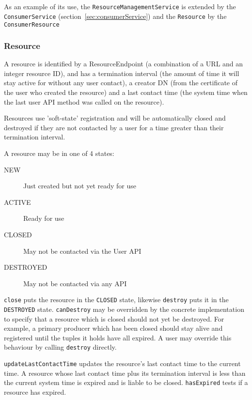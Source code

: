 As an example of its use, the  \texttt{ResourceManagementService} is extended
by the \texttt{ConsumerService} (section~\ref{sec:consumerService}) and
the \texttt{Resource} by the \texttt{ConsumerResource}

\subsubsection{Resource}
\label{sec:Resource}

A resource is identified by a ResourceEndpoint (a combination of a URL
and an integer resource ID), and has a termination interval (the
amount of time it will stay active for without any user contact), a
creator DN (from the certificate of the user who created the resource)
and a last contact time (the system time when the last user API method
was called on the resource).

Resources use 'soft-state' registration and will be automatically
closed and destroyed if they are not contacted by a user for a time
greater than their termination interval.

A resource may be in one of 4 states:

\begin{description}

\item[NEW] Just created but not yet ready for use

\item[ACTIVE] Ready for use

\item[CLOSED] May not be contacted via the User API

\item[DESTROYED] May not be contacted via any API

\end{description}

\texttt{close} puts the resource in the \texttt{CLOSED} state,
likewise \texttt{destroy} puts it in the \texttt{DESTROYED}
state. \texttt{canDestroy} may be overridden by the concrete
implementation to specify that a resource which is closed should not
yet be destroyed. For example, a primary producer which has been
closed should stay alive and registered until the tuples it holds have
all expired. A user may override this behaviour by calling
\texttt{destroy} directly.

\texttt{updateLastContactTime} updates the resource's last contact
time to the current time.  A resource whose last contact time plus its
termination interval is less than the current system time is expired
and is liable to be closed. \texttt{hasExpired} tests if a resource
has expired.

